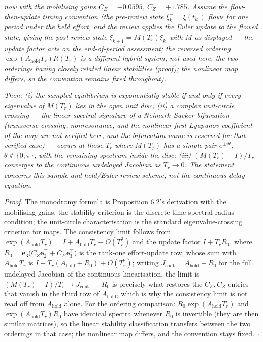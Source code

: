 \documentclass[11pt]{article}
\begin{document}
\emph{now with the mobilising gains \(C_E = -0.0595\), \(C_Z = +1.785\).
Assume the flow-then-update timing convention (the pre-review state
\(\xi_k^- = \xi(t_k^-)\) flows for one period under the held effort, and
the review applies the Euler update to the flowed state, giving the
post-review state \(\xi_{k+1}^- = M(T_r)\xi_k^-\) with \(M\) as
displayed --- the update factor acts on the end-of-period assessment;
the reversed ordering \(\exp(A_{\mathrm{hold}}T_r)R(T_r)\) is a
different hybrid system, not used here, the two orderings having closely
related linear stabilities (proof); the nonlinear map differs, so the
convention remains fixed throughout).}

\emph{Then: (i) the sampled equilibrium is exponentially stable if and
only if every eigenvalue of \(M(T_r)\) lies in the open unit disc; (ii)
a complex unit-circle crossing --- the linear spectral signature of a
Neimark--Sacker bifurcation (transverse crossing, nonresonance, and the
nonlinear first Lyapunov coefficient of the map are not verified here,
and the bifurcation name is reserved for that verified case) --- occurs
at those \(T_r\) where \(M(T_r)\) has a simple pair \(e^{\pm i\theta}\),
\(\theta \notin \{0, \pi\}\), with the remaining spectrum inside the
disc; (iii) \((M(T_r) - I)/T_r\) converges to the continuous undelayed
Jacobian as \(T_r \to 0\). The statement concerns this
sample-and-hold/Euler review scheme, not the continuous-delay equation.}

\emph{Proof.} The monodromy formula is Proposition 6.2's derivation with
the mobilising gains; the stability criterion is the discrete-time
spectral radius condition; the unit-circle characterisation is the
standard eigenvalue-crossing criterion for maps. The consistency limit
follows from
\(\exp(A_{\mathrm{hold}}T_r) = I + A_{\mathrm{hold}}T_r + O(T_r^2)\) and
the update factor \(I + T_r R_0\), where
\(R_0 = \mathbf e_3\bigl(C_Z \mathbf e_2^\top + C_E \mathbf e_3^\top\bigr)\)
is the rank-one effort-update row, whose sum with
\(A_{\mathrm{hold}}T_r\) is
\(I + T_r(A_{\mathrm{hold}} + R_0) + O(T_r^2)\); writing
\(J_{\mathrm{cont}} = A_{\mathrm{hold}} + R_0\) for the full undelayed
Jacobian of the continuous linearisation, the limit is
\((M(T_r) - I)/T_r \to J_{\mathrm{cont}}\) --- \(R_0\) is precisely what
restores the \(C_E, C_Z\) entries that vanish in the third row of
\(A_{\mathrm{hold}}\), which is why the consistency limit is not read
off from \(A_{\mathrm{hold}}\) alone. For the ordering comparison:
\(R_0 \exp(A_{\mathrm{hold}}T_r)\) and
\(\exp(A_{\mathrm{hold}}T_r) R_0\) have identical spectra whenever
\(R_0\) is invertible (they are then similar matrices), so the linear
stability classification transfers between the two orderings in that
case; the nonlinear map differs, and the convention stays fixed. \ensuremath{\square}
\end{document}
